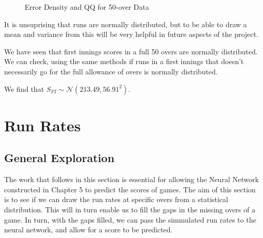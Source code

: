 \begin{figure}[h]
    \centering
    \qquad
    \caption{Error Density and QQ for 50-over Data}
    \label{errDistAndQQRunsScored}
\end{figure}

It is unsuprising that runs are normally distributed, but to be able to draw a mean and variance from this will be very helpful in future aspects of the project.

We have seen that first innings scores in a full 50 overs are normally distributed. We can check, using the same methods if runs in a first innings that 
doesn't necessarily go for the full allowance of overs is normally distributed. 

We find that $S_{FI} \sim \mathcal{N}(213.49,56.91^2)$. 

\section{Run Rates}
\label{exprr}

\subsection{General Exploration}
The work that follows in this section is essential for allowing the Neural Network constructed in Chapter 5 to predict the scores of games. The aim of this section is 
to see if we can draw the run rates at specific overs from a statistical distribution. This will in turn enable us to fill the gaps in the missing overs of a game. In turn, 
with the gaps filled, we can pass the simmulated run rates to the neural network, and allow for a score to be predicted. \\

